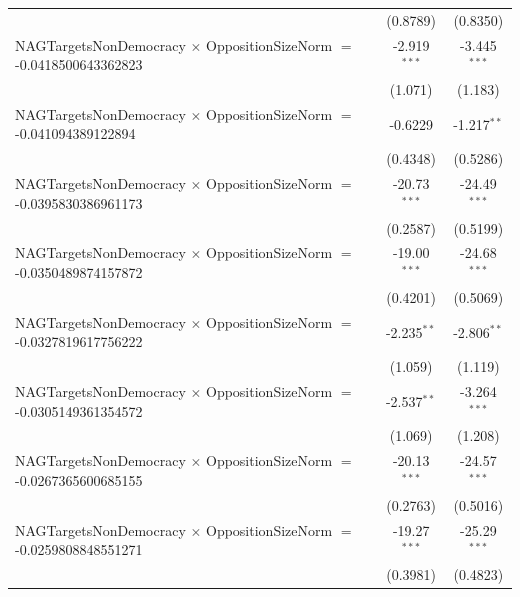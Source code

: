 \begin{tabular}{lcc}
                                                                                & (0.8789)             & (0.8350)\\   
   NAGTargetsNonDemocracy $\times$ OppositionSizeNorm $=$ -0.0418500643362823   & -2.919$^{***}$       & -3.445$^{***}$\\   
                                                                                & (1.071)              & (1.183)\\   
   NAGTargetsNonDemocracy $\times$ OppositionSizeNorm $=$ -0.041094389122894    & -0.6229              & -1.217$^{**}$\\   
                                                                                & (0.4348)             & (0.5286)\\   
   NAGTargetsNonDemocracy $\times$ OppositionSizeNorm $=$ -0.0395830386961173   & -20.73$^{***}$       & -24.49$^{***}$\\   
                                                                                & (0.2587)             & (0.5199)\\   
   NAGTargetsNonDemocracy $\times$ OppositionSizeNorm $=$ -0.0350489874157872   & -19.00$^{***}$       & -24.68$^{***}$\\   
                                                                                & (0.4201)             & (0.5069)\\   
   NAGTargetsNonDemocracy $\times$ OppositionSizeNorm $=$ -0.0327819617756222   & -2.235$^{**}$        & -2.806$^{**}$\\   
                                                                                & (1.059)              & (1.119)\\   
   NAGTargetsNonDemocracy $\times$ OppositionSizeNorm $=$ -0.0305149361354572   & -2.537$^{**}$        & -3.264$^{***}$\\   
                                                                                & (1.069)              & (1.208)\\   
   NAGTargetsNonDemocracy $\times$ OppositionSizeNorm $=$ -0.0267365600685155   & -20.13$^{***}$       & -24.57$^{***}$\\   
                                                                                & (0.2763)             & (0.5016)\\   
   NAGTargetsNonDemocracy $\times$ OppositionSizeNorm $=$ -0.0259808848551271   & -19.27$^{***}$       & -25.29$^{***}$\\   
                                                                                & (0.3981)             & (0.4823)\\   

\end{tabular}
